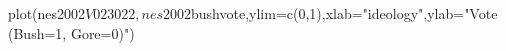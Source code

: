 \begin{Schunk}
\begin{Sinput}
 plot(nes2002$V023022,nes2002$bushvote,ylim=c(0,1),xlab="ideology",ylab="Vote (Bush=1, Gore=0)")
\end{Sinput}
\end{Schunk}

